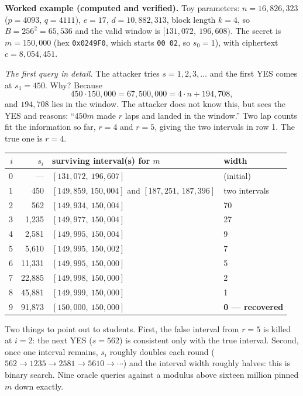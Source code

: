 \documentclass[11pt]{article}
\begin{document}
\textbf{Worked example (computed and verified).} Toy parameters: $n=16{,}826{,}323$ ($p=4093$, $q=4111$), $e=17$, $d=10{,}882{,}313$, block length $k=4$, so $B=256^2=65{,}536$ and the valid window is $[131{,}072,\ 196{,}608)$. The secret is $m=150{,}000$ (hex \texttt{0x0249F0}, which starts \texttt{00 02}, so $s_0=1$), with ciphertext $c=8{,}054{,}451$.

\emph{The first query in detail.} The attacker tries $s=1,2,3,\dots$ and the first YES comes at $s_1=450$. Why? Because
\[
450\cdot150{,}000 = 67{,}500{,}000 = 4\cdot n + 194{,}708,
\]
and $194{,}708$ lies in the window. The attacker does not know this, but sees the YES and reasons: ``$450m$ made $r$ laps and landed in the window.'' Two lap counts fit the information so far, $r=4$ and $r=5$, giving the two intervals in row 1. The true one is $r=4$.

\begin{center}
\begin{tabular}{@{}rrll@{}}
\toprule
$i$ & $s_i$ & surviving interval(s) for $m$ & width \\
\midrule
0 & --- & $[131{,}072,\ 196{,}607]$ & (initial) \\
1 & 450 & $[149{,}859,\,150{,}004]$ and $[187{,}251,\,187{,}396]$ & two intervals \\
2 & 562 & $[149{,}934,\ 150{,}004]$ & 70 \\
3 & 1{,}235 & $[149{,}977,\ 150{,}004]$ & 27 \\
4 & 2{,}581 & $[149{,}995,\ 150{,}004]$ & 9 \\
5 & 5{,}610 & $[149{,}995,\ 150{,}002]$ & 7 \\
6 & 11{,}331 & $[149{,}995,\ 150{,}000]$ & 5 \\
7 & 22{,}885 & $[149{,}998,\ 150{,}000]$ & 2 \\
8 & 45{,}881 & $[149{,}999,\ 150{,}000]$ & 1 \\
9 & 91{,}873 & $[150{,}000,\ 150{,}000]$ & \textbf{0 --- recovered} \\
\bottomrule
\end{tabular}
\end{center}

Two things to point out to students. First, the false interval from $r=5$ is killed at $i=2$: the next YES ($s=562$) is consistent only with the true interval. Second, once one interval remains, $s_i$ roughly doubles each round ($562\to1235\to2581\to5610\to\cdots$) and the interval width roughly halves: this is binary search. Nine oracle queries against a modulus above sixteen million pinned $m$ down exactly.
\end{document}
